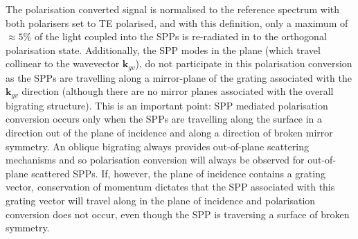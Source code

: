 The polarisation converted signal is normalised to the reference spectrum with both polarisers set to TE polarised, and with this definition, only a maximum of $\approx 5\%$ of the light coupled into the SPPs is re-radiated in to the orthogonal polarisation state. Additionally, the SPP modes in the plane (which travel collinear to the wavevector $\mathbf{k}_{gv}$), do not participate in this polarisation conversion as the SPPs are travelling along a mirror-plane of the grating associated with the $\mathbf{k}_{gv}$ direction (although there are no mirror planes associated with the overall bigrating structure). This is an important point: SPP mediated polarisation conversion occurs only when the SPPs are travelling along the surface in a direction out of the plane of incidence and along a direction of broken mirror symmetry. An oblique bigrating always provides out-of-plane scattering mechanisms and so polarisation conversion will always be observed for out-of-plane scattered SPPs. If, however, the plane of incidence contains a grating vector, conservation of momentum dictates that the SPP associated with this grating vector will travel along  in the plane of incidence and polarisation conversion does not occur, even though the SPP is traversing a surface of broken symmetry.

